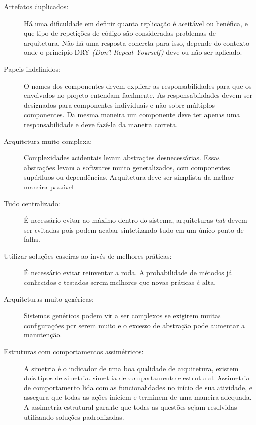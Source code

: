 \begin{description}

\item[Artefatos duplicados:] Há uma dificuldade em definir quanta replicação é aceitável ou benéfica, e que tipo de repetições de código são consideradas problemas de arquitetura. Não há uma resposta concreta para isso, depende do contexto onde o principio DRY \textit{(Don't Repeat Yourself)} deve ou não ser aplicado.

\item[Papeis indefinidos:] O nomes dos componentes devem explicar as responsabilidades para que os envolvidos no projeto entendam facilmente. As responsabilidades devem ser designados para componentes individuais e não sobre múltiplos componentes. Da mesma maneira um componente deve ter apenas uma responsabilidade e deve fazê-la da maneira correta.

\item[Arquitetura muito complexa:] Complexidades acidentais levam abstrações desnecessárias. Essas abstrações levam a softwares muito generalizados, com componentes supérfluos ou dependências. Arquitetura deve ser simplista da melhor maneira possível.

\item[Tudo centralizado:] É necessário evitar ao máximo dentro do sistema, arquiteturas \textit{hub} devem ser evitadas pois podem acabar sintetizando tudo em um único ponto de falha.

\item[Utilizar soluções caseiras ao invés de melhores práticas:] É necessário evitar reinventar a roda. A probabilidade de métodos já conhecidos e testados serem melhores que novas práticas é alta.

\item[Arquiteturas muito genéricas:] Sistemas genéricos podem vir a ser complexos se exigirem muitas configurações por serem muito e o excesso de abstração pode aumentar a manutenção.

\item[Estruturas com comportamentos assimétricos:]
A simetria é o indicador de uma boa qualidade de arquitetura, existem dois tipos de simetria: simetria de comportamento e estrutural. Assimetria de comportamento lida com as funcionalidades no início de sua atividade, e assegura que todas as ações iniciem e terminem de uma maneira adequada. A assimetria estrutural garante que todas as questões sejam resolvidas utilizando soluções padronizadas.


\end{description}
